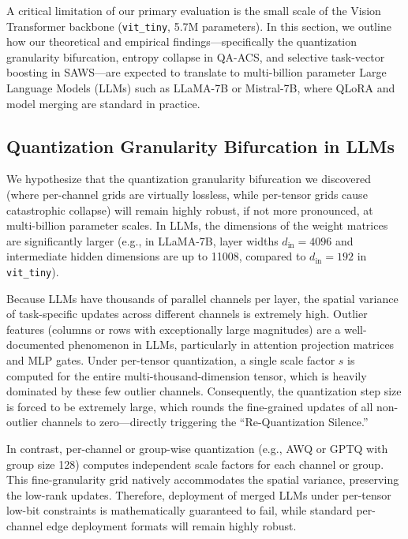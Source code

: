\documentclass{article}
\theoremstyle{plain}
\theoremstyle{definition}
\theoremstyle{remark}
\begin{document}
A critical limitation of our primary evaluation is the small scale of the Vision Transformer backbone (\texttt{vit\_tiny}, 5.7M parameters). In this section, we outline how our theoretical and empirical findings—specifically the quantization granularity bifurcation, entropy collapse in QA-ACS, and selective task-vector boosting in SAWS—are expected to translate to multi-billion parameter Large Language Models (LLMs) such as LLaMA-7B or Mistral-7B, where QLoRA and model merging are standard in practice.

\subsection{Quantization Granularity Bifurcation in LLMs}
We hypothesize that the quantization granularity bifurcation we discovered (where per-channel grids are virtually lossless, while per-tensor grids cause catastrophic collapse) will remain highly robust, if not more pronounced, at multi-billion parameter scales. In LLMs, the dimensions of the weight matrices are significantly larger (e.g., in LLaMA-7B, layer widths $d_{\text{in}} = 4096$ and intermediate hidden dimensions are up to 11008, compared to $d_{\text{in}} = 192$ in \texttt{vit\_tiny}).

Because LLMs have thousands of parallel channels per layer, the spatial variance of task-specific updates across different channels is extremely high. Outlier features (columns or rows with exceptionally large magnitudes) are a well-documented phenomenon in LLMs, particularly in attention projection matrices and MLP gates. Under per-tensor quantization, a single scale factor $s$ is computed for the entire multi-thousand-dimension tensor, which is heavily dominated by these few outlier channels. Consequently, the quantization step size is forced to be extremely large, which rounds the fine-grained updates of all non-outlier channels to zero—directly triggering the ``Re-Quantization Silence.'' 

In contrast, per-channel or group-wise quantization (e.g., AWQ or GPTQ with group size 128) computes independent scale factors for each channel or group. This fine-granularity grid natively accommodates the spatial variance, preserving the low-rank updates. Therefore, deployment of merged LLMs under per-tensor low-bit constraints is mathematically guaranteed to fail, while standard per-channel edge deployment formats will remain highly robust.
\end{document}
